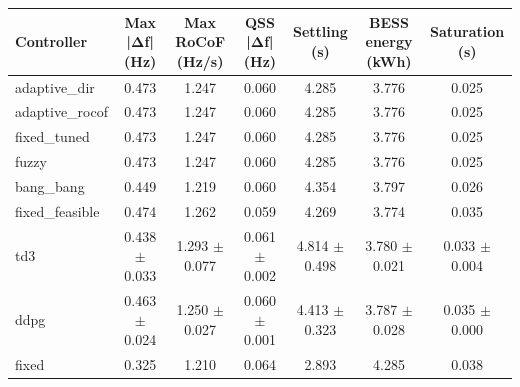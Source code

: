 \begin{tabular}{lcccccc}
\toprule
Controller & Max |Δf| (Hz) & Max RoCoF (Hz/s) & QSS |Δf| (Hz) & Settling (s) & BESS energy (kWh) & Saturation (s) \\
\midrule
adaptive\_dir & 0.473 & 1.247 & 0.060 & 4.285 & 3.776 & 0.025 \\
adaptive\_rocof & 0.473 & 1.247 & 0.060 & 4.285 & 3.776 & 0.025 \\
fixed\_tuned & 0.473 & 1.247 & 0.060 & 4.285 & 3.776 & 0.025 \\
fuzzy & 0.473 & 1.247 & 0.060 & 4.285 & 3.776 & 0.025 \\
bang\_bang & 0.449 & 1.219 & 0.060 & 4.354 & 3.797 & 0.026 \\
fixed\_feasible & 0.474 & 1.262 & 0.059 & 4.269 & 3.774 & 0.035 \\
td3 & 0.438 $\pm$ 0.033 & 1.293 $\pm$ 0.077 & 0.061 $\pm$ 0.002 & 4.814 $\pm$ 0.498 & 3.780 $\pm$ 0.021 & 0.033 $\pm$ 0.004 \\
ddpg & 0.463 $\pm$ 0.024 & 1.250 $\pm$ 0.027 & 0.060 $\pm$ 0.001 & 4.413 $\pm$ 0.323 & 3.787 $\pm$ 0.028 & 0.035 $\pm$ 0.000 \\
fixed & 0.325 & 1.210 & 0.064 & 2.893 & 4.285 & 0.038 \\
\bottomrule
\end{tabular}